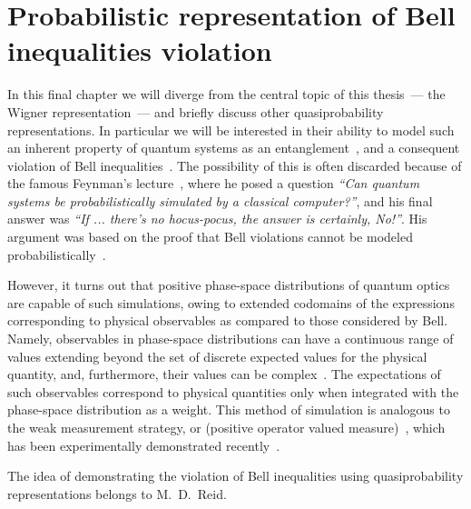 \chapter{Probabilistic representation of Bell inequalities violation}
\label{cha:bell-ineq}

In this final chapter we will diverge from the central topic of this thesis~--- the Wigner representation~--- and briefly discuss other quasiprobability representations.
In particular we will be interested in their ability to model such an inherent property of quantum systems as an entanglement~\cite{Einstein1935}, and a consequent violation of Bell inequalities~\cite{Bell1964}.
The possibility of this is often discarded because of the famous Feynman's lecture~\cite{Feynman1982}, where he posed a question \textit{``Can quantum systems be probabilistically simulated by a classical computer?''}, and his final answer was \textit{``If ... there's no hocus-pocus, the answer is certainly, No!''}.
His argument was based on the proof that Bell violations cannot be modeled probabilistically~\cite{Bell1964}.

However, it turns out that positive phase-space distributions of quantum optics~\cite{Husimi1940,Drummond1980,Hillery1984,Gardiner2004} are capable of such simulations, owing to extended codomains of the expressions corresponding to physical observables as compared to those considered by Bell.
Namely, observables in phase-space distributions can have a continuous range of values extending beyond the set of discrete expected values for the physical quantity, and, furthermore, their values can be complex~\cite{Reid1986}.
The expectations of such observables correspond to physical quantities only when integrated with the phase-space distribution as a weight.
This method of simulation is analogous to the weak measurement strategy, or  (positive operator valued measure)~\cite{Aharonov1988}, which has been experimentally demonstrated recently~\cite{Goggin2011}.

The idea of demonstrating the violation of Bell inequalities using quasiprobability representations belongs to M.~D.~Reid.





